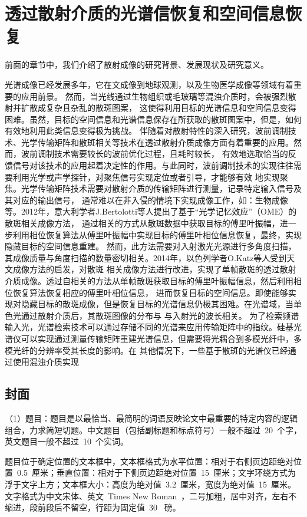 
\chapter{透过散射介质的光谱信恢复和空间信息恢复}

前面的章节中，我们介绍了散射成像的研究背景、发展现状及研究意义。

光谱成像已经发展多年，它在文成像到地球观测，以及生物医学成像等领域有着重要的应用前景。
然而，当光线通过生物组织或毛玻璃等混浊介质时，会被强烈散射并扩散成复杂且杂乱的散斑图案，
这使得利用目标的光谱信息和空间信息变得困难。虽然，目标的空间信息和光谱信息保存在所获取的散斑图案中，但是，如何有效地利用此类信息变得极为挑战。
伴随着对散射特性的深入研究，波前调制技术、光学传输矩阵和散斑相关等技术在透过散射介质成像方面有着重要的应用。然而，波前调制技术需要较长的波前优化过程，且耗时较长，
有效地选取恰当的反馈信号对该技术的应用起着决定性的作用。与此同时，波前调制技术的实现往往需要利用光学或声学探针，对聚焦信号实现定位或者引导，才能够有效
地实现聚焦。光学传输矩阵技术需要对散射介质的传输矩阵进行测量，记录特定输入信号及其对应的输出信号，
通常难以在非入侵的情境下实现成像工作，如：生物成像等。2012年，意大利学者J.Bertolotti等人提出了基于“光学记忆效应”（OME）的散斑相关成像方法，
通过相关的方式从散斑数据中获取目标的傅里叶振幅，进一步利用相位恢复算法从傅里叶振幅中实现目标的傅里叶相位信息恢复，最终，实现隐藏目标的空间信息重建。
然而，此方法需要对入射激光光源进行多角度扫描，其成像质量与角度扫描的数量密切相关。2014年，以色列学者O.Katz等人受到天文成像方法的启发，对散斑
相关成像方法进行改进，实现了单帧散斑的透过散射介质成像。透过自相关的方法从单帧散斑获取目标的傅里叶振幅信息，然后利用相位恢复算法恢复相应的傅里叶相位信息，
进而恢复目标的空间信息。即使能够实现对隐藏目标的散斑成像，但是恢复目标的光谱信息仍极其困难。在光谱域，当单色光通过散射介质后，其散斑图像的分布与
与入射光的波长相关。
为了检索频谱输入光，光谱检索技术可以通过存储不同的光谱来应用传输矩阵中的指纹。硅基光谱仪可以实现通过测量传输矩阵重建光谱信息，但需要将光耦合到多模光纤中，多模光纤的分辨率受其长度的影响。在
其他情况下，一些基于散斑的光谱仪已经通过使用混浊介质实现

\section{封面}

（1）题目：题目是以最恰当、最简明的词语反映论文中最重要的特定内容的逻辑组合，力求简短切题。中文题目（包括副标题和标点符号）一般不超过~20~个字，英文题目一般不超过~10~个实词。

题目位于确定位置的文本框中，文本框格式为水平位置：相对于右侧页边距绝对位置~0.5~厘米；垂直位置：相对于下侧页边距绝对位置~15~厘米；文字环绕方式为浮于文字上方；文本框大小：高度为绝对值~3.2~厘米，宽度为绝对值~15~厘米。文字格式为中文宋体、英文~Times New Roman~，二号加粗，居中对齐，左右不缩进，段前段后不留空，行距为固定值~30~ 磅。

